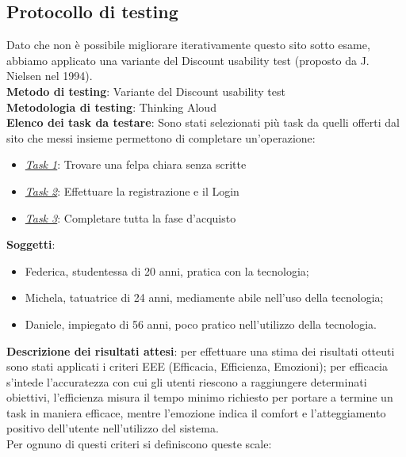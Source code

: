 \documentclass[12pt,a4paper]{report}
\begin{document}
\subsection{Protocollo di testing}
Dato che non è possibile migliorare iterativamente questo sito sotto esame, abbiamo applicato una variante del Discount usability  test (proposto da J. Nielsen nel 1994).\vspace{5mm}
\\\vspace{5mm}
\textbf{Metodo di testing}: Variante del Discount usability test
\\\vspace{5mm}
\textbf{Metodologia di testing}: Thinking Aloud
\\\vspace{5mm}
\textbf{Elenco dei task da testare}: Sono stati selezionati più task da quelli offerti dal sito che messi insieme permettono di completare un'operazione:
  \begin{itemize}
    \item \underline{\textit{Task 1}}: Trovare una felpa chiara senza scritte
    \item \underline{\textit{Task 2}}: Effettuare la registrazione e il Login
    \item \underline{\textit{Task 3}}: Completare tutta la fase d'acquisto
  \end{itemize}
  \textbf{Soggetti}:
  \begin{itemize}
    \item Federica, studentessa di 20 anni, pratica con la tecnologia;
    \item Michela, tatuatrice di 24 anni, mediamente abile nell'uso della tecnologia;
    \item Daniele, impiegato di 56 anni, poco pratico nell'utilizzo della tecnologia.
  \end{itemize}
  \textbf{Descrizione dei risultati attesi}: per effettuare una stima dei risultati otteuti sono stati applicati i criteri EEE (Efficacia, Efficienza, Emozioni); per efficacia s'intede l'accuratezza con cui gli utenti riescono a raggiungere determinati obiettivi, l'efficienza misura il tempo minimo richiesto per portare a termine un task in maniera efficace, mentre l'emozione indica il comfort e l'atteggiamento positivo dell'utente nell'utilizzo del sistema.\\
  Per ognuno di questi criteri si definiscono queste scale:
\end{document}
